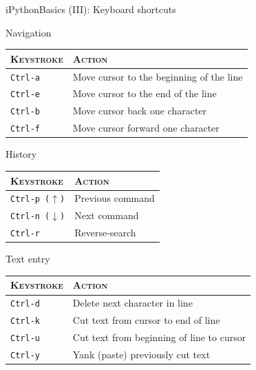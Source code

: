 \documentclass[10pt,compress]{beamer} %
\begin{document}
\begin{frame}{iPython}{Basics (III): Keyboard shortcuts}
    \footnotesize{
        Navigation\\
        \begin{tabular}{ll}\hline
       \textsc{Keystroke} &  \textsc{Action}\\ \hline
	   \texttt{Ctrl-a} & Move cursor to the beginning of the line  \\
	   \texttt{Ctrl-e} & Move cursor to the end of the line  \\
	   \texttt{Ctrl-b} & Move cursor back one character  \\
	   \texttt{Ctrl-f} & Move cursor forward one character  \\\hline
        \end{tabular}

    \bigskip
     History\\
       \begin{tabular}{ll}\hline
       \textsc{Keystroke} &  \textsc{Action}\\ \hline
       \texttt{Ctrl-p ($\uparrow$)} & Previous command  \\
       \texttt{Ctrl-n ($\downarrow$)} & Next command  \\
	   \texttt{Ctrl-r} & Reverse-search  \\\hline
    \end{tabular}

    \bigskip
        Text entry\\
        \begin{tabular}{ll}\hline
       \textsc{Keystroke} &  \textsc{Action}\\ \hline
	   \texttt{Ctrl-d} & Delete next character in line  \\
	   \texttt{Ctrl-k} & Cut text from cursor to end of line  \\
	   \texttt{Ctrl-u} & Cut text from beginning of line to cursor  \\
       \texttt{Ctrl-y} & Yank (paste) previously cut text  \\\hline
       \end{tabular}
   }
\end{frame}
\end{document}
